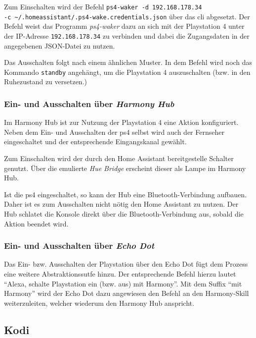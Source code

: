 Zum Einschalten wird der Befehl \texttt{ps4-waker -d 192.168.178.34 \\ -c \textasciitilde{}/.homeassistant/.ps4-wake.credentials.json} über das \ac{cli} abgesetzt.
Der Befehl weist das Programm \textit{ps4-waker} dazu an sich mit der Playstation 4 unter der IP-Adresse \texttt{192.168.178.34} zu verbinden und dabei die Zugangsdaten in der angegebenen JSON-Datei zu nutzen.

Das Ausschalten folgt nach einem ähnlichen Muster.
In dem Befehl wird noch das Kommando \texttt{standby} angehängt, um die Playstation 4 auszuschalten (bzw. in den Ruhezustand zu versetzen.)

\subsubsection{Ein- und Ausschalten über \textit{Harmony Hub}}
Im Harmony Hub ist zur Nutzung der Playstation 4 eine Aktion konfiguriert.
Neben dem Ein- und Ausschalten der \ac{ps4} selbst wird auch der Fernseher eingeschaltet und der entsprechende Eingangskanal gewählt.

Zum Einschalten wird der durch den Home Assistant bereitgestelle Schalter genutzt. Über die emulierte \textit{Hue Bridge} erscheint dieser als Lampe im Harmony Hub.

Ist die \ac{ps4} eingeschaltet, so kann der Hub eine Bluetooth-Verbindung aufbauen. Daher ist es zum Ausschalten nicht nötig den Home Assistant zu nutzen.
Der Hub schlatet die Konsole direkt über die Bluetooth-Verbindung aus, sobald die Aktion beendet wird.

\subsubsection{Ein- und Ausschalten über \textit{Echo Dot}}
Das Ein- bzw. Ausschalten der Playstation über den Echo Dot fügt dem Prozess eine weitere Abstraktionssutfe hinzu.
Der entsprechende Befehl hierzu lautet \enquote{Alexa, schalte Playstation ein (bzw. aus) mit Harmony}.
Mit dem Suffix \enquote{mit Harmony} wird der Echo Dot dazu angewiesen den Befehl an den Harmony-Skill weiterzuleiten,
welcher wiederum den Harmony Hub anspricht.


\subsection{Kodi}

